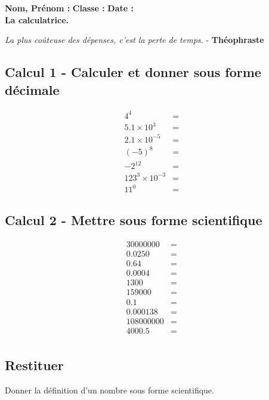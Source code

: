 \documentclass[10pt]{article}
\begin{document}

\textbf{Nom, Prénom :} \hspace{8cm} \textbf{Classe :} \hspace{3cm} \textbf{Date :}\\
\textbf{La calculatrice.}

\begin{center}
  \textit{La plus coûteuse des dépenses, c’est la perte de temps.}  - \textbf{Théophraste}
\end{center}

\subsection*{Calcul 1 - Calculer et donner sous forme décimale} 
\begin{eqnarray*}
	4^4                  &=& \\
	5.1 \times 10^3      &=& \\
	2.1 \times 10^{-5}   &=& \\
	(-5)^8               &=& \\
	-2^12                &=& \\
	123^3 \times 10^{-3} &=& \\
	11^0                 &=& 
\end{eqnarray*}
\subsection*{Calcul 2 - Mettre sous forme scientifique} 
\begin{eqnarray*}
	30 000 000  &=& \\
	0.0250      &=& \\
	0.64        &=& \\
	0.0004       &=& \\
	1300         &=& \\
	15 9000     &=& \\
	0.1         &=& \\
	0.000 138   &=& \\
	108 000 000 &=& \\
	4 000.5    &=& \\
\end{eqnarray*}

\subsection*{Restituer}
Donner la définition d'un nombre sous forme scientifique. 
\end{document}
